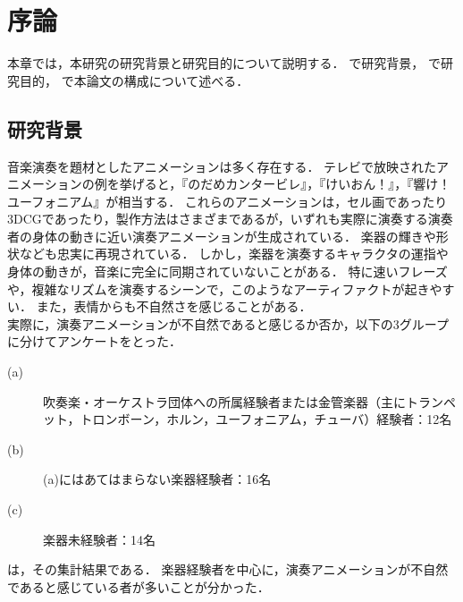 \chapter{序論}
\label{chap:intro}

本章では，本研究の研究背景と研究目的について説明する．
で研究背景，
で研究目的，
で本論文の構成について述べる．

\section{研究背景}\label{sec:background}
\indent
音楽演奏を題材としたアニメーションは多く存在する．
テレビで放映されたアニメーションの例を挙げると，『のだめカンタービレ』，『けいおん！』，『響け！ユーフォニアム』が相当する．
これらのアニメーションは，セル画であったり3DCGであったり，製作方法はさまざまであるが，いずれも実際に演奏する演奏者の身体の動きに近い演奏アニメーションが生成されている．
楽器の輝きや形状なども忠実に再現されている．
しかし，楽器を演奏するキャラクタの運指や身体の動きが，音楽に完全に同期されていないことがある．
特に速いフレーズや，複雑なリズムを演奏するシーンで，このようなアーティファクトが起きやすい．
また，表情からも不自然さを感じることがある．\\
\indent
実際に，演奏アニメーションが不自然であると感じるか否か，以下の3グループに分けてアンケートをとった．
\begin{description}
	\item[(a)] 吹奏楽・オーケストラ団体への所属経験者または金管楽器（主にトランペット，トロンボーン，ホルン，ユーフォニアム，チューバ）経験者：12名
	\item[(b)] (a)にはあてはまらない楽器経験者：16名
	\item[(c)] 楽器未経験者：14名
\end{description}
は，その集計結果である．
楽器経験者を中心に，演奏アニメーションが不自然であると感じている者が多いことが分かった．
